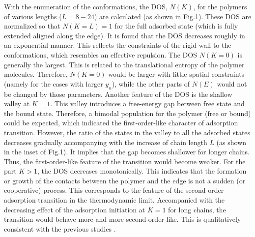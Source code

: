 \documentclass[aps,pre,twocolumn,showpacs,preprintnumbers,amsmath,amssymb]{revtex4-1}
\begin{document}

With the enumeration of the conformations, the DOS, $N(K)$, for the polymers
of various lengths ($L=8-24$)
are calculated (as shown in Fig.1). These DOS are normalized so that $N(K=L)=1$
for the full adsorbed state (which is fully extended aligned along the edge).
It is found that the DOS decreases roughly in an exponential manner. This
reflects the constraints of the rigid wall to the conformations, which
resembles an effective repulsion. The DOS $N(K=0)$ is generally the largest.
This is related to the translational entropy of the polymer molecules.
Therefore, $N(K=0)$ would be larger with little spatial constraints
(namely for the cases with larger $y_u$), while the other parts of $N(E)$
would not be changed by those parameters. Another feature of the DOS
is the shallow valley at $K=1$. This valley introduces a free-energy
gap between free state and the bound state. Therefore, a bimodal
population for the polymer (free or bound) could be expected, which
indicated the first-order-like character of adsorption transition.
However, the ratio of the states in the valley to all the adsorbed states
decreases gradually accompanying with the increase of chain length $L$ (as
shown in the inset of Fig.1).
It implies that the gap becomes shallower for longer chains. Thus,
the first-order-like feature of the transition would become weaker.
For the part $K>1$, the DOS decreases monotonically. This indicates
that the formation or growth of the contacts between the polymer and
the edge is not a sudden (or cooperative) process. This corresponds to
the feature of the second-order adsorption transition in the thermodynamic
limit. Accompanied with the decreasing effect of the adsorption initiation
at $K=1$ for long chains, the transition would behave more and more
second-order-like. This is qualitatively consistent with the previous
studies \cite{PCCP10,JCP09,JCP09b}.
\end{document}

